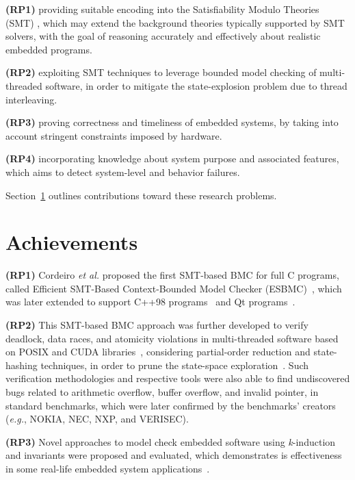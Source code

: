 \documentclass{acm_sen_article}
\begin{document}
\textbf{(RP1)} providing suitable encoding into the Satisfiability Modulo Theories (SMT) \cite{BarrettSST09}, which may extend the background theories typically supported by SMT solvers, with the goal of reasoning accurately and effectively about realistic embedded programs.

\textbf{(RP2)} exploiting SMT techniques to leverage bounded model checking of multi-threaded software, in order to mitigate the state-explosion problem due to thread interleaving.
	
\textbf{(RP3)} proving correctness and timeliness of embedded systems, by taking into account stringent constraints imposed by hardware.
	
\textbf{(RP4)} incorporating knowledge about system purpose and associated features, which aims to detect system-level and behavior failures.

Section~\ref{achievements} outlines contributions toward these research problems.

\section{Achievements}
\label{achievements}

\textbf{(RP1)} Cordeiro {\it et al.} proposed the first SMT-based BMC for full C programs, called Efficient SMT-Based Context-Bounded Model Checker (ESBMC)~\cite{Cordeiro12}, which was later extended to support C++98 programs~\cite{ECBS13} and Qt programs~\cite{Sousa15}. 

\textbf{(RP2)} This SMT-based BMC approach was further developed to verify deadlock, data races, and atomicity violations in multi-threaded software based on POSIX and CUDA libraries~\cite{CordeiroF11,Pereira15}, considering partial-order reduction and state-hashing techniques, in order to prune the state-space exploration~\cite{morse15}. Such verification methodologies and respective tools were also able to find undiscovered bugs related to arithmetic overflow, buffer overflow, and invalid pointer, in standard benchmarks, which were later confirmed by the benchmarks' creators ({\it e.g.}, NOKIA, NEC, NXP, and VERISEC). 

\textbf{(RP3)} Novel approaches to model check embedded software using \textit{k}-induction and invariants were proposed and evaluated, which demonstrates is effectiveness in some real-life embedded system applications~\cite{Gadelha15,Rocha15}. 
\end{document}
